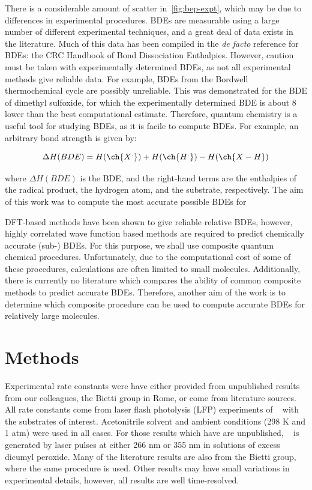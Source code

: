 There is a considerable amount of scatter in~\ref{fig:bep-expt}, which may be due to differences in experimental procedures. BDEs are measurable using a large number of different experimental techniques, and a great deal of data exists in the literature. Much of this data has been compiled in the \emph{de facto} reference for BDEs: the CRC Handbook of Bond Dissociation Enthalpies.\cite{Luo2002} However, caution must be taken with experimentally determined BDEs, as not all experimental methods give reliable data. For example, BDEs from the Bordwell\cite{Bordwell1988} thermochemical cycle are possibly unreliable.\cite{Salamone2012, Miller2016} This was demonstrated for the BDE of dimethyl sulfoxide, for which the experimentally determined BDE is about 8 \kcalmol lower than the best computational estimate.\cite{Salamone2012} Therefore, quantum chemistry is a useful tool for studying BDEs, as it is facile to compute BDEs. For example, an arbitrary  bond strength is given by:

\begin{equation}
  \Delta H(BDE) =  H(\ch{X^.}) + H(\ch{H^.}) - H(\ch{X-H})
\end{equation}

\noindent where $\Delta H(BDE)$ is the BDE, and the right-hand terms are the enthalpies of the radical product, the hydrogen atom, and the substrate, respectively. The aim of this work was to compute the most accurate possible BDEs for

DFT-based methods have been shown to give reliable relative BDEs, however, highly correlated wave function based methods are required to predict chemically accurate (sub-\kcalmol) BDEs.\cite{DiLabio1999, Chan2012, Wiberg2014} For this purpose, we shall use composite quantum chemical procedures. Unfortunately, due to the computational cost of some of these procedures, calculations are often limited to small molecules. Additionally, there is currently no literature which compares the ability of common composite methods to predict accurate BDEs. Therefore, another aim of the work is to determine which composite procedure can be used to compute accurate BDEs for relatively large molecules.

\section{Methods}

Experimental rate constants were have either provided from unpublished results from our colleagues, the Bietti group in Rome, or come from literature sources.\cite{Bietti2010, Bietti2011, Pischel2001, Salamone2011, Salamone2012, Salamone2012a, Salamone2013, Salamone2015} All rate constants come from laser flash photolysis (LFP) experiments of \cumo~ with the substrates of interest. Acetonitrile solvent and ambient conditions (298 K and 1 atm) were used in all cases. For those results which have are unpublished, \cumo~ is generated by laser pulses at either 266 nm or 355 nm in solutions of excess dicumyl peroxide. Many of the literature results are also from the Bietti group, where the same procedure is used. Other results may have small variations in experimental details, however, all results are well time-resolved.

